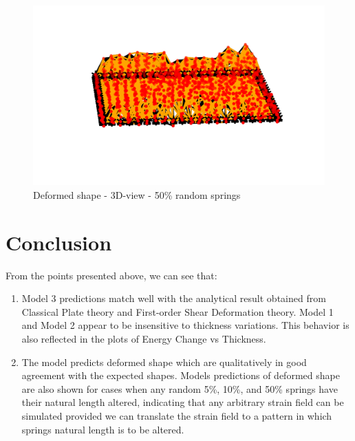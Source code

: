 \begin{figure}[!htbp]
\begin{minipage}{0.3\textwidth}
    \centering
    \includegraphics[width = 1\textwidth]{Figures/rand_50_3D.png}
    \caption{Deformed shape - 3D-view - 50\% random springs}
    \label{fig:rand_50_3d}
\end{minipage}
\end{figure}

\newpage
\section{Conclusion}
From the points presented above, we can see that:
\begin{enumerate}
    \item Model 3 predictions match well with the analytical result obtained from Classical Plate theory and First-order Shear Deformation theory. Model 1 and Model 2 appear to be insensitive to thickness variations. This behavior is also reflected in the plots of Energy Change vs Thickness.
    \item The model predicts deformed shape which are qualitatively in good agreement with the expected shapes. Models predictions of deformed shape are also shown for cases when any random 5\%, 10\%, and 50\% springs have their natural length altered, indicating that any arbitrary strain field can be simulated provided we can translate the strain field to a pattern in which springs natural length is to be altered.
\end{enumerate}

